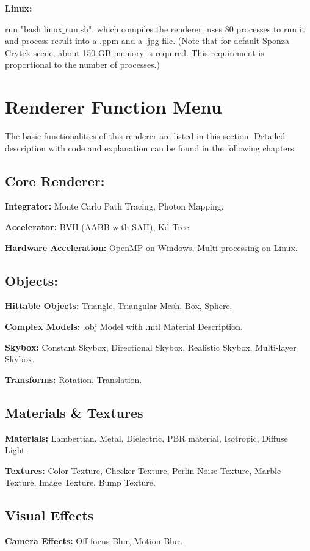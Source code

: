 \documentclass[utf8]{article}
\begin{document}
\noindent
\textbf{Linux:}

run "bash linux$\_$run.sh", which compiles the renderer, uses 80 processes to run it and process result into a .ppm and a .jpg file. (Note that for default Sponza Crytek scene, about 150 GB memory is required. This requirement is proportional to the number of processes.)

\section{Renderer Function Menu}
The basic functionalities of this renderer are listed in this section. Detailed description with code and explanation can be found in the following chapters.

\subsection{Core Renderer:}
\noindent
\textbf{Integrator: } Monte Carlo Path Tracing, Photon Mapping.

\noindent
\textbf{Accelerator: } BVH (AABB with SAH), Kd-Tree.

\noindent
\textbf{Hardware Acceleration: } OpenMP on Windows, Multi-processing on Linux.

\subsection{Objects: }
\noindent
\textbf{Hittable Objects: } Triangle, Triangular Mesh, Box, Sphere.

\noindent
\textbf{Complex Models: } .obj Model with .mtl Material Description.

\noindent
\textbf{Skybox: } Constant Skybox, Directional Skybox, Realistic Skybox, Multi-layer Skybox.

\noindent
\textbf{Transforms: } Rotation, Translation.

\subsection{Materials \& Textures}
\noindent
\textbf{Materials: } Lambertian, Metal, Dielectric, PBR material, Isotropic, Diffuse Light.

\noindent
\textbf{Textures: } Color Texture, Checker Texture, Perlin Noise Texture, Marble Texture, Image Texture, Bump Texture.

\subsection{Visual Effects}
\noindent
\textbf{Camera Effects: } Off-focus Blur, Motion Blur.
\end{document}
